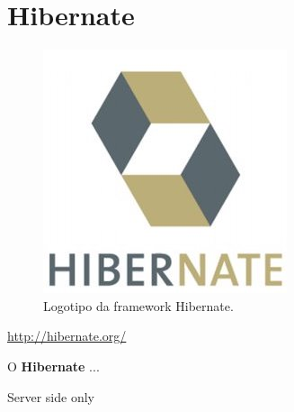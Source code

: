 \section{Hibernate}
\label{subsec:hibernate}

\begin{figure}[H]
    \centering
    \includegraphics[scale=0.25]{images/hibernate.jpg}
    \caption{Logotipo da framework Hibernate.}
    \label{fig:hibernate}
\end{figure}

\href{http://hibernate.org/}{http://hibernate.org/}

\hspace{5mm} O \textbf{Hibernate} ...


Server side only